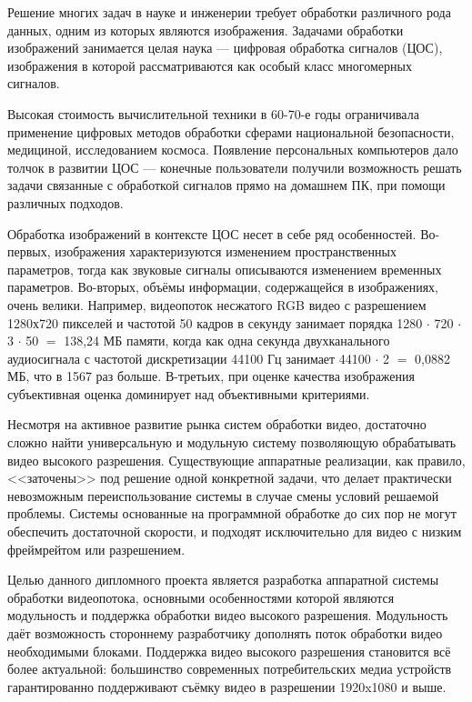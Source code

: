 \label{sec:intro}

Решение многих задач в науке и инженерии требует обработки различного рода данных, одним из которых являются изображения.
Задачами обработки изображений занимается целая наука --- цифровая обработка сигналов (ЦОС),
изображения в которой рассматриваются как особый класс многомерных сигналов.

Высокая стоимость вычислительной техники в 60-70-е годы ограничивала применение
цифровых методов обработки сферами национальной безопасности, медициной, исследованием космоса.
Появление персональных компьютеров дало толчок в развитии ЦОС --- конечные пользователи
получили возможность решать задачи связанные с обработкой сигналов прямо на домашнем ПК,
при помощи различных подходов.

Обработка изображений в контексте ЦОС несет в себе ряд особенностей.
Во-первых, изображения характеризуются изменением пространственных параметров, тогда как звуковые сигналы описываются изменением временных параметров.
Во-вторых, объёмы информации, содержащейся в изображениях, очень велики.
Например, видеопоток несжатого RGB видео
с разрешением 1280х720 пикселей и частотой 50 кадров в секунду
занимает порядка 1280 $\cdot$ 720 $\cdot$ 3 $\cdot$ 50 $=$ 138,24 МБ памяти, когда как одна
секунда двухканального аудиосигнала с частотой дискретизации 44100 Гц
занимает 44100 $\cdot$ 2 $=$ 0,0882 МБ, что в 1567 раз больше. В-третьих, при оценке качества
изображения субъективная оценка доминирует над объективными критериями.

Несмотря на активное развитие рынка систем обработки видео, достаточно сложно найти
универсальную и модульную систему позволяющую обрабатывать видео высокого разрешения.
Существующие аппаратные реализации, как правило, <<заточены>> под решение одной конкретной задачи,
что делает практически невозможным переиспользование системы в случае смены условий решаемой проблемы.
Системы основанные на программной обработке до сих пор не могут обеспечить достаточной скорости,
и подходят исключительно для видео с низким фреймрейтом или разрешением. %


Целью данного дипломного проекта является разработка аппаратной системы обработки
видеопотока, основными особенностями которой являются модульность и поддержка
обработки видео высокого разрешения. Модульность даёт возможность стороннему
разработчику дополнять поток обработки видео необходимыми блоками.
Поддержка видео высокого разрешения становится всё более актуальной:
большинство современных потребительских медиа устройств гарантированно
поддерживают съёмку видео в разрешении 1920x1080 и выше. %


